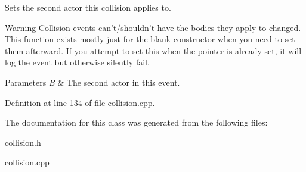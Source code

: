 Sets the second actor this collision applies to. 

\begin{DoxyWarning}{Warning}
\hyperlink{classMezzanine_1_1Collision}{Collision} events can't/shouldn't have the bodies they apply to changed. This function exists mostly just for the blank constructor when you need to set them afterward. If you attempt to set this when the pointer is already set, it will log the event but otherwise silently fail. 
\end{DoxyWarning}

\begin{DoxyParams}{Parameters}
{\em B} & The second actor in this event. \\
\hline
\end{DoxyParams}


Definition at line 134 of file collision.cpp.



The documentation for this class was generated from the following files:\begin{DoxyCompactItemize}
\item 
collision.h\item 
collision.cpp\end{DoxyCompactItemize}
